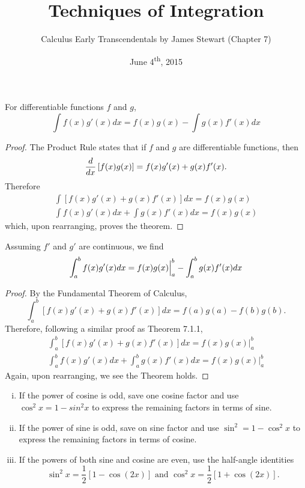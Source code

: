 \documentclass[a4paper,8pt]{article}
\title{Techniques of Integration}
\author{Calculus Early Transcendentals by James Stewart (Chapter 7)}
\date{June 4\textsuperscript{th}, 2015}
\begin{document}
\maketitle
{}

\begin{outline}

    For differentiable functions \(f\) and \(g\), \[ \int f(x)g'(x)dx = f(x)g(x) - \int g(x)f'(x)dx \]

    \begin{proof}
      The Product Rule states that if \(f\) and \(g\) are differentiable functions, then
      \[
        \frac{d}{dx}\left[f(x)g(x)\right] = f(x)g'(x) + g(x)f'(x)\text{.}
      \]
      Therefore
      \begin{gather*}
        \int\left[f(x)g'(x)+g(x)f'(x)\right]dx = f(x)g(x) \\
        \int f(x)g'(x)dx + \int g(x)f'(x)dx = f(x)g(x)
      \end{gather*}
      which, upon rearranging, proves the theorem.
    \end{proof}

    Assuming \(f'\) and \(g'\) are continuous, we find
    \[
      \int_a^b f(x)g'(x)dx = f(x)g(x)\Big{\vert}_a^b - \int_a^b g(x)f'(x)dx
    \]

    \begin{proof}
      By the Fundamental Theorem of Calculus,
      \[
        \int_a^b\left[f(x)g'(x)+g(x)f'(x)\right]dx = f(a)g(a) - f(b)g(b)\text{.}
      \]
      Therefore, following a similar proof as Theorem 7.1.1,
      \begin{gather*}
        \int_a^b\left[f(x)g'(x)+g(x)f'(x)\right]dx = f(x)g(x)\Big\vert_a^b \\
        \int_a^b f(x)g'(x)dx + \int_a^b g(x)f'(x)dx = f(x)g(x)\Big\vert_a^b
      \end{gather*}
      Again, upon rearranging, we see the Theorem holds.
    \end{proof}

    \begin{enumerate}[i.]
      \item
        If the power of cosine is odd, save one cosine factor and use \(\cos^2x=1-sin^2x\) to express the remaining
        factors in terms of sine.
      \item
        If the power of sine is odd, save on sine factor and use \(\sin^2=1-\cos^2x\) to express the remaining
        factors in terms of cosine.
      \item
        If the powers of both sine and cosine are even, use the half-angle identities
        \[\sin^2x = \frac{1}{2}[1-\cos{(2x)}] \text{ and } \cos^2x = \frac{1}{2}[1+\cos{(2x)}]\text{.}\]
    \end{enumerate}


\end{outline}
\end{document}
